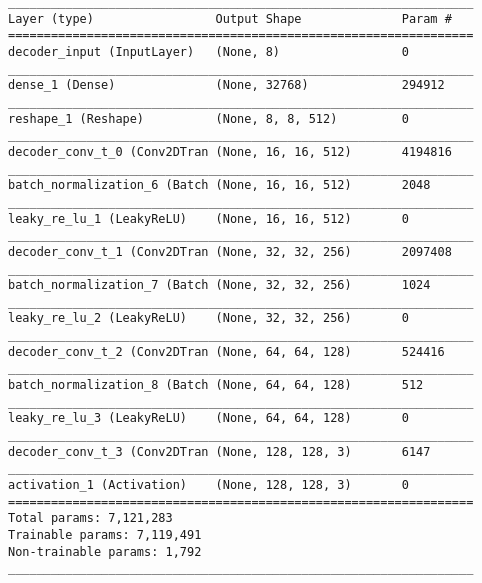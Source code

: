 \begin{lstlisting}[caption={\textsc{Mnist}-\ac{VAE} Decoder},captionpos=b,basicstyle=\tiny, label={lst:mnist-vae-decoder}]
_________________________________________________________________
Layer (type)                 Output Shape              Param #
=================================================================
decoder_input (InputLayer)   (None, 8)                 0
_________________________________________________________________
dense_1 (Dense)              (None, 32768)             294912
_________________________________________________________________
reshape_1 (Reshape)          (None, 8, 8, 512)         0
_________________________________________________________________
decoder_conv_t_0 (Conv2DTran (None, 16, 16, 512)       4194816
_________________________________________________________________
batch_normalization_6 (Batch (None, 16, 16, 512)       2048
_________________________________________________________________
leaky_re_lu_1 (LeakyReLU)    (None, 16, 16, 512)       0
_________________________________________________________________
decoder_conv_t_1 (Conv2DTran (None, 32, 32, 256)       2097408
_________________________________________________________________
batch_normalization_7 (Batch (None, 32, 32, 256)       1024
_________________________________________________________________
leaky_re_lu_2 (LeakyReLU)    (None, 32, 32, 256)       0
_________________________________________________________________
decoder_conv_t_2 (Conv2DTran (None, 64, 64, 128)       524416
_________________________________________________________________
batch_normalization_8 (Batch (None, 64, 64, 128)       512
_________________________________________________________________
leaky_re_lu_3 (LeakyReLU)    (None, 64, 64, 128)       0
_________________________________________________________________
decoder_conv_t_3 (Conv2DTran (None, 128, 128, 3)       6147
_________________________________________________________________
activation_1 (Activation)    (None, 128, 128, 3)       0
=================================================================
Total params: 7,121,283
Trainable params: 7,119,491
Non-trainable params: 1,792
_________________________________________________________________
\end{lstlisting}